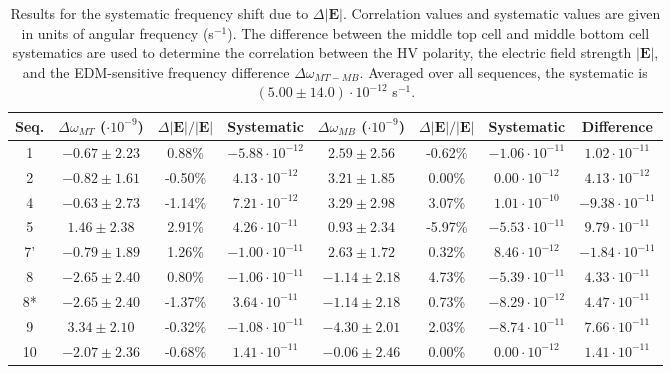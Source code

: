\documentclass [10pt, twoside] {uwthesis}[2012/04/02]
\begin{document}
\begin{table}[t] 
\footnotesize													
\begin{center}
\caption[$\Delta|\mathbf{E}|$ frequency shift limits] 
{\narrower Results for the systematic frequency shift due to $\Delta|\mathbf{E}|$. Correlation values and systematic values are given in units of angular frequency (s$^{-1}$). The difference between the middle top cell and middle bottom cell systematics are used to determine the correlation between the HV polarity, the electric field strength $|\mathbf{E}|$, and the EDM-sensitive frequency difference $\Delta\omega_{MT-MB}$. Averaged over all sequences, the systematic is $(5.00 \pm 14.0) \cdot 10^{-12}$ s$^{-1}$.}   
\begin{tabular}{c|ccc|ccc|c}
\hline \hline									
Seq. & $\Delta\omega_{MT}$ ($\cdot 10^{-9}$)&$\Delta|\mathbf{E}|/|\mathbf{E}|$ & Systematic & $\Delta\omega_{MB}$ ($\cdot 10^{-9}$)&$\Delta|\mathbf{E}|/|\mathbf{E}|$ & Systematic & Difference \\
\hline 
1    & $-0.67 \pm 2.23 $ &  0.88\% & $-5.88 \cdot 10^{-12}$ & $ 2.59 \pm 2.56$  & -0.62\% & $-1.06 \cdot 10^{-11}$ & $  1.02 \cdot 10^{-11}$\\
2    & $-0.82 \pm 1.61 $ & -0.50\% & $ 4.13 \cdot 10^{-12}$ & $ 3.21 \pm 1.85$  &  0.00\% & $ 0.00 \cdot 10^{-12}$ & $  4.13 \cdot 10^{-12}$\\
4    & $-0.63 \pm 2.73 $ & -1.14\% & $ 7.21 \cdot 10^{-12}$ & $ 3.29 \pm 2.98$  &  3.07\% & $ 1.01 \cdot 10^{-10}$ & $ -9.38 \cdot 10^{-11}$\\
5    & $ 1.46 \pm 2.38 $ &  2.91\% & $ 4.26 \cdot 10^{-11}$ & $ 0.93 \pm 2.34$  & -5.97\% & $-5.53 \cdot 10^{-11}$ & $  9.79 \cdot 10^{-11}$\\
7'   & $-0.79 \pm 1.89 $ &  1.26\% & $-1.00 \cdot 10^{-11}$ & $ 2.63 \pm 1.72$  &  0.32\% & $ 8.46 \cdot 10^{-12}$ & $ -1.84 \cdot 10^{-11}$\\
8    & $-2.65 \pm 2.40 $ &  0.80\% & $-1.06 \cdot 10^{-11}$ & $-1.14 \pm 2.18$  &  4.73\% & $-5.39 \cdot 10^{-11}$ & $  4.33 \cdot 10^{-11}$\\
8*   & $-2.65 \pm 2.40 $ & -1.37\% & $ 3.64 \cdot 10^{-11}$ & $-1.14 \pm 2.18$  &  0.73\% & $-8.29 \cdot 10^{-12}$ & $  4.47 \cdot 10^{-11}$\\
9    & $ 3.34 \pm 2.10 $ & -0.32\% & $-1.08 \cdot 10^{-11}$ & $-4.30 \pm 2.01$  &  2.03\% & $-8.74 \cdot 10^{-11}$ & $  7.66 \cdot 10^{-11}$\\
10   & $-2.07 \pm 2.36 $ & -0.68\% & $ 1.41 \cdot 10^{-11}$ & $-0.06 \pm 2.46$  &  0.00\% & $ 0.00 \cdot 10^{-12}$ & $  1.41 \cdot 10^{-11}$\\

\end{tabular}
\end{center}
\end{table}
\end{document}
